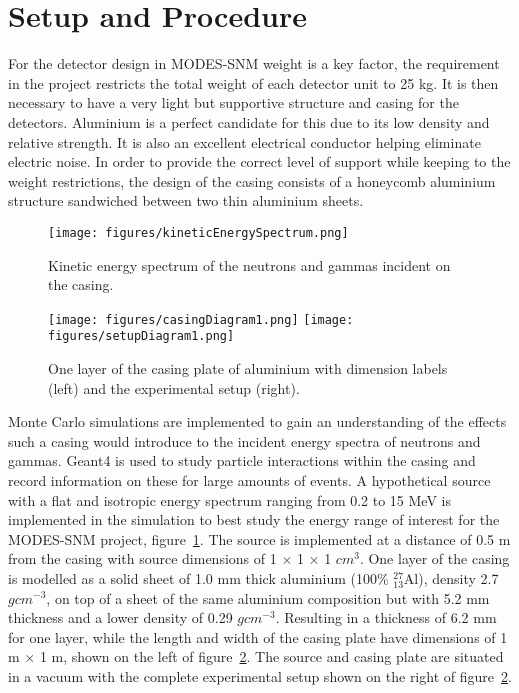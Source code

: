 \documentclass{article}
\begin{document}
\section{Setup and Procedure}

For the detector design in MODES-SNM weight is a key factor, the requirement in the project restricts the total weight of each detector unit to 25 kg. It is then necessary to have a very light but supportive structure and casing for the detectors. Aluminium is a perfect candidate for this due to its low density and relative strength. It is also an excellent electrical conductor helping eliminate electric noise. In order to provide the correct level of support while keeping to the weight restrictions, the design of the casing consists of a honeycomb aluminium structure sandwiched between two thin aluminium sheets.
\newline
\begin{figure}[htbp]
\begin{center}
\texttt{[image: figures/kineticEnergySpectrum.png]}
\caption{Kinetic energy spectrum of the neutrons and gammas incident on the casing.}
\label{fig:incidentEnergy}
\end{center}
\end{figure}

\begin{figure}[htbp]
\begin{center}
\texttt{[image: figures/casingDiagram1.png]}
\texttt{[image: figures/setupDiagram1.png]}
\caption{One layer of the casing plate of aluminium with dimension labels (left) and the experimental setup (right).}
\label{fig:casingDiagram}
\end{center}
\end{figure}

Monte Carlo simulations are implemented to gain an understanding of the effects such a casing would introduce to the incident energy spectra of neutrons and gammas. Geant4\cite{geant4} is used to study particle interactions within the casing and record information on these for large amounts of events. A hypothetical source with a flat and isotropic energy spectrum ranging from 0.2 to 15 MeV is implemented in the simulation to best study the energy range of interest for the MODES-SNM project, figure~\ref{fig:incidentEnergy}. The source is implemented at a distance of 0.5 m from the casing with source dimensions of 1 $\times$ 1 $\times$ 1 $cm^{3}$. One layer of the casing is modelled as a solid sheet of 1.0 mm thick aluminium (100\% $^{27}_{13}$Al), density 2.7 $gcm^{-3}$, on top of a sheet of the same aluminium composition but with 5.2 mm thickness and a lower density of 0.29 $gcm^{-3}$. Resulting in a thickness of 6.2 mm for one layer, while the length and width of the casing plate have dimensions of 1 m $\times$ 1 m, shown on the left of figure~\ref{fig:casingDiagram}. The source and casing plate are situated in a vacuum with the complete experimental setup shown on the right of figure~\ref{fig:casingDiagram}. 
\newline
\end{document}
